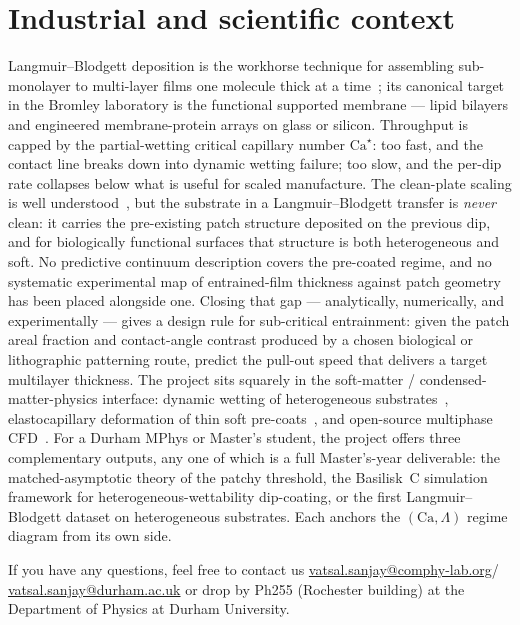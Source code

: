 \documentclass[11pt]{article}
\begin{document}
\section*{Industrial and scientific context}

Langmuir--Blodgett deposition is the workhorse technique for assembling sub-monolayer to multi-layer films one molecule thick at a time~\citep{bonnWettingSpreading2009}; its canonical target in the Bromley laboratory is the functional supported membrane --- lipid bilayers and engineered membrane-protein arrays on glass or silicon. Throughput is capped by the partial-wetting critical capillary number $\mathrm{Ca}^\star$: too fast, and the contact line breaks down into dynamic wetting failure; too slow, and the per-dip rate collapses below what is useful for scaled manufacture. The clean-plate scaling is well understood~\citep{landauLevich1942,quere1999fluid,rioBoulogne2017}, but the substrate in a Langmuir--Blodgett transfer is \emph{never} clean: it carries the pre-existing patch structure deposited on the previous dip, and for biologically functional surfaces that structure is both heterogeneous and soft. No predictive continuum description covers the pre-coated regime, and no systematic experimental map of entrained-film thickness against patch geometry has been placed alongside one. Closing that gap --- analytically, numerically, and experimentally --- gives a design rule for sub-critical entrainment: given the patch areal fraction and contact-angle contrast produced by a chosen biological or lithographic patterning route, predict the pull-out speed that delivers a target multilayer thickness. The project sits squarely in the soft-matter / condensed-matter-physics interface: dynamic wetting of heterogeneous substrates~\citep{bonnWettingSpreading2009}, elastocapillary deformation of thin soft pre-coats~\citep{bertin2022}, and open-source multiphase CFD~\citep{popinet2015quadtree,basiliskVatsal}. For a Durham MPhys or Master's student, the project offers three complementary outputs, any one of which is a full Master's-year deliverable: the matched-asymptotic theory of the patchy threshold, the Basilisk~C simulation framework for heterogeneous-wettability dip-coating, or the first Langmuir--Blodgett dataset on heterogeneous substrates. Each anchors the $(\mathrm{Ca}, \Lambda)$ regime diagram from its own side.

If you have any questions, feel free to contact us \href{mailto:vatsal.sanjay@comphy-lab.org}{vatsal.sanjay@comphy-lab.org}/\\\href{mailto:vatsal.sanjay@durham.ac.uk}{vatsal.sanjay@durham.ac.uk} or drop by Ph255 (Rochester building) at the Department of Physics at Durham University.
\end{document}
